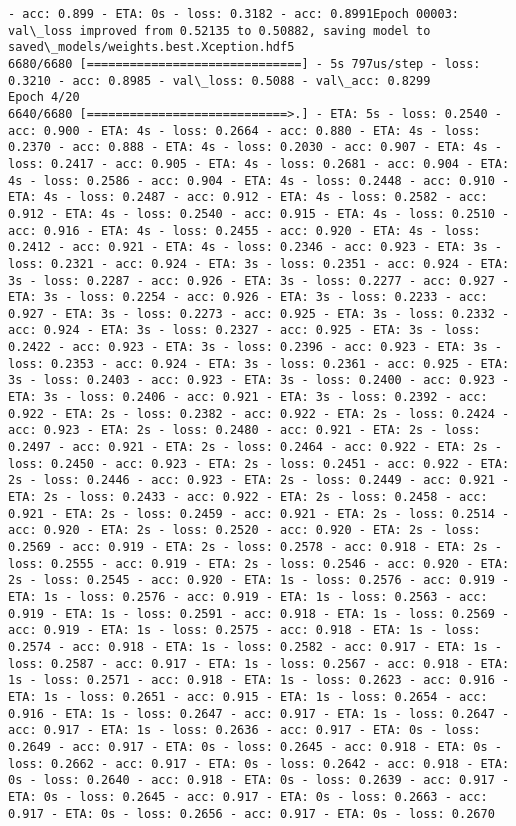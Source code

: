 \documentclass[11pt]{article}
\begin{document}
\begin{Verbatim}[commandchars=\\\{\}]
- acc: 0.899 - ETA: 0s - loss: 0.3182 - acc: 0.8991Epoch 00003: val\_loss improved from 0.52135 to 0.50882, saving model to saved\_models/weights.best.Xception.hdf5
6680/6680 [==============================] - 5s 797us/step - loss: 0.3210 - acc: 0.8985 - val\_loss: 0.5088 - val\_acc: 0.8299
Epoch 4/20
6640/6680 [============================>.] - ETA: 5s - loss: 0.2540 - acc: 0.900 - ETA: 4s - loss: 0.2664 - acc: 0.880 - ETA: 4s - loss: 0.2370 - acc: 0.888 - ETA: 4s - loss: 0.2030 - acc: 0.907 - ETA: 4s - loss: 0.2417 - acc: 0.905 - ETA: 4s - loss: 0.2681 - acc: 0.904 - ETA: 4s - loss: 0.2586 - acc: 0.904 - ETA: 4s - loss: 0.2448 - acc: 0.910 - ETA: 4s - loss: 0.2487 - acc: 0.912 - ETA: 4s - loss: 0.2582 - acc: 0.912 - ETA: 4s - loss: 0.2540 - acc: 0.915 - ETA: 4s - loss: 0.2510 - acc: 0.916 - ETA: 4s - loss: 0.2455 - acc: 0.920 - ETA: 4s - loss: 0.2412 - acc: 0.921 - ETA: 4s - loss: 0.2346 - acc: 0.923 - ETA: 3s - loss: 0.2321 - acc: 0.924 - ETA: 3s - loss: 0.2351 - acc: 0.924 - ETA: 3s - loss: 0.2287 - acc: 0.926 - ETA: 3s - loss: 0.2277 - acc: 0.927 - ETA: 3s - loss: 0.2254 - acc: 0.926 - ETA: 3s - loss: 0.2233 - acc: 0.927 - ETA: 3s - loss: 0.2273 - acc: 0.925 - ETA: 3s - loss: 0.2332 - acc: 0.924 - ETA: 3s - loss: 0.2327 - acc: 0.925 - ETA: 3s - loss: 0.2422 - acc: 0.923 - ETA: 3s - loss: 0.2396 - acc: 0.923 - ETA: 3s - loss: 0.2353 - acc: 0.924 - ETA: 3s - loss: 0.2361 - acc: 0.925 - ETA: 3s - loss: 0.2403 - acc: 0.923 - ETA: 3s - loss: 0.2400 - acc: 0.923 - ETA: 3s - loss: 0.2406 - acc: 0.921 - ETA: 3s - loss: 0.2392 - acc: 0.922 - ETA: 2s - loss: 0.2382 - acc: 0.922 - ETA: 2s - loss: 0.2424 - acc: 0.923 - ETA: 2s - loss: 0.2480 - acc: 0.921 - ETA: 2s - loss: 0.2497 - acc: 0.921 - ETA: 2s - loss: 0.2464 - acc: 0.922 - ETA: 2s - loss: 0.2450 - acc: 0.923 - ETA: 2s - loss: 0.2451 - acc: 0.922 - ETA: 2s - loss: 0.2446 - acc: 0.923 - ETA: 2s - loss: 0.2449 - acc: 0.921 - ETA: 2s - loss: 0.2433 - acc: 0.922 - ETA: 2s - loss: 0.2458 - acc: 0.921 - ETA: 2s - loss: 0.2459 - acc: 0.921 - ETA: 2s - loss: 0.2514 - acc: 0.920 - ETA: 2s - loss: 0.2520 - acc: 0.920 - ETA: 2s - loss: 0.2569 - acc: 0.919 - ETA: 2s - loss: 0.2578 - acc: 0.918 - ETA: 2s - loss: 0.2555 - acc: 0.919 - ETA: 2s - loss: 0.2546 - acc: 0.920 - ETA: 2s - loss: 0.2545 - acc: 0.920 - ETA: 1s - loss: 0.2576 - acc: 0.919 - ETA: 1s - loss: 0.2576 - acc: 0.919 - ETA: 1s - loss: 0.2563 - acc: 0.919 - ETA: 1s - loss: 0.2591 - acc: 0.918 - ETA: 1s - loss: 0.2569 - acc: 0.919 - ETA: 1s - loss: 0.2575 - acc: 0.918 - ETA: 1s - loss: 0.2574 - acc: 0.918 - ETA: 1s - loss: 0.2582 - acc: 0.917 - ETA: 1s - loss: 0.2587 - acc: 0.917 - ETA: 1s - loss: 0.2567 - acc: 0.918 - ETA: 1s - loss: 0.2571 - acc: 0.918 - ETA: 1s - loss: 0.2623 - acc: 0.916 - ETA: 1s - loss: 0.2651 - acc: 0.915 - ETA: 1s - loss: 0.2654 - acc: 0.916 - ETA: 1s - loss: 0.2647 - acc: 0.917 - ETA: 1s - loss: 0.2647 - acc: 0.917 - ETA: 1s - loss: 0.2636 - acc: 0.917 - ETA: 0s - loss: 0.2649 - acc: 0.917 - ETA: 0s - loss: 0.2645 - acc: 0.918 - ETA: 0s - loss: 0.2662 - acc: 0.917 - ETA: 0s - loss: 0.2642 - acc: 0.918 - ETA: 0s - loss: 0.2640 - acc: 0.918 - ETA: 0s - loss: 0.2639 - acc: 0.917 - ETA: 0s - loss: 0.2645 - acc: 0.917 - ETA: 0s - loss: 0.2663 - acc: 0.917 - ETA: 0s - loss: 0.2656 - acc: 0.917 - ETA: 0s - loss: 0.2670 
\end{Verbatim}
\end{document}
